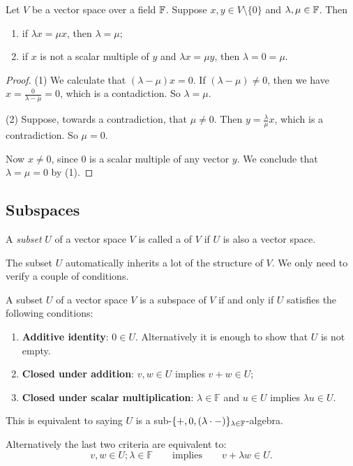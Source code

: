\begin{lemma} \label{scalarMultiplicationBijection}
Let $V$ be a vector space over a field $\mathbb{F}$. Suppose $x,y\in V\setminus\{0\}$ and $\lambda,\mu\in \mathbb{F}$. Then
\begin{enumerate}
\item if $\lambda x = \mu x$, then $\lambda = \mu$;
\item if $x$ is not a scalar multiple of $y$ and $\lambda x = \mu y$, then $\lambda = 0 = \mu$.
\end{enumerate}
\end{lemma}
\begin{proof}
(1) We calculate that $(\lambda - \mu)x = 0$. If $(\lambda - \mu) \neq 0$, then we have $x = \frac{0}{\lambda - \mu} = 0$, which is a contadiction. So $\lambda = \mu$.

(2) Suppose, towards a contradiction, that $\mu \neq 0$. Then $y = \frac{\lambda}{\mu}x$, which is a contradiction. So $\mu = 0$.

Now $x \neq 0$, since $0$ is a scalar multiple of any vector $y$. We conclude that $\lambda = \mu = 0$ by (1).
\end{proof}



\subsection{Subspaces}
\begin{definition}
A \textit{subset} $U$ of a vector space $V$ is called a  of $V$ if $U$ is also a vector space.
\end{definition}
The subset $U$ automatically inherits a lot of the structure of $V$. We only need to verify a couple of conditions.
\begin{proposition} \label{subspaceCriterion}
A subset $U$ of a vector space $V$ is a subspace of $V$ \textup{if and only if} $U$ satisfies the following conditions:
\begin{enumerate}
\item \textbf{Additive identity}: $0 \in U$. Alternatively it is enough to show that $U$ is not empty.
\item \textbf{Closed under addition}: $v,w \in U$ implies $v+w\in U$;
\item \textbf{Closed under scalar multiplication}: $\lambda \in \mathbb{F}$ and $u\in U$ implies $\lambda u \in U$.
\end{enumerate}
This is equivalent to saying $U$ is a sub-$\{+,0, (\lambda\cdot -)\}_{\lambda\in\mathbb{F}}$-algebra.
\end{proposition}
Alternatively the last two criteria are equivalent to:
\[ v,w\in U; \lambda \in \mathbb{F} \qquad \text{implies} \qquad v+\lambda w \in U. \]


